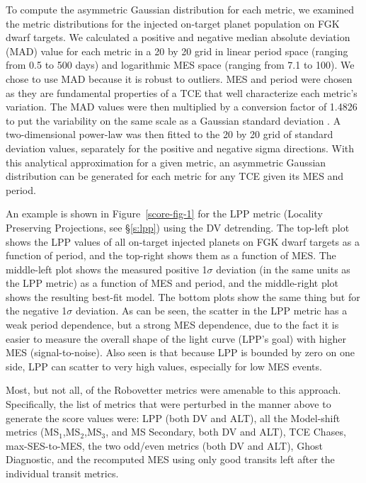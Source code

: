 To compute the asymmetric Gaussian distribution for each metric, we examined the metric distributions for the injected on-target planet population on FGK dwarf targets. We calculated a positive and negative median absolute deviation (MAD) value for each metric in a 20 by 20 grid in linear period space (ranging from 0.5 to 500 days) and logarithmic MES space (ranging from 7.1 to 100). We chose to use MAD because it is robust to outliers. MES and period were chosen as they are fundamental properties of a TCE that well characterize each metric's variation. The MAD values were then multiplied by a conversion factor of 1.4826 to put the variability on the same scale as a Gaussian standard deviation \citep{Hampel1974,Ruppert2010}. A two-dimensional power-law was then fitted to the 20 by 20 grid of standard deviation values, separately for the positive and negative sigma directions. With this analytical approximation for a given metric, an asymmetric Gaussian distribution can be generated for each metric for any TCE given its MES and period.

An example is shown in Figure~\ref{score-fig-1} for the LPP metric (Locality Preserving Projections, see \S\ref{s:lpp}) using the DV detrending. The top-left plot shows the LPP values of all on-target injected planets on FGK dwarf targets as a function of period, and the top-right shows them as a function of MES. The middle-left plot shows the measured positive 1$\sigma$ deviation (in the same units as the LPP metric) as a function of MES and period, and the middle-right plot shows the resulting best-fit model. The bottom plots show the same thing but for the negative 1$\sigma$ deviation. As can be seen, the scatter in the LPP metric has a weak period dependence, but a strong MES dependence, due to the fact it is easier to measure the overall shape of the light curve (LPP's goal) with higher MES (signal-to-noise). Also seen is that because LPP is bounded by zero on one side, LPP can scatter to very high values, especially for low MES events. 

Most, but not all, of the Robovetter metrics were amenable to this approach. Specifically, the list of metrics that were perturbed in the manner above to generate the score values were: LPP (both DV and ALT), all the Model-shift metrics (MS$_1$,MS$_2$,MS$_3$, and MS Secondary, both DV and ALT), TCE Chases, max-SES-to-MES, the two odd/even metrics (both DV and ALT), Ghost Diagnostic, and the recomputed MES using only good transits left after the individual transit metrics.

